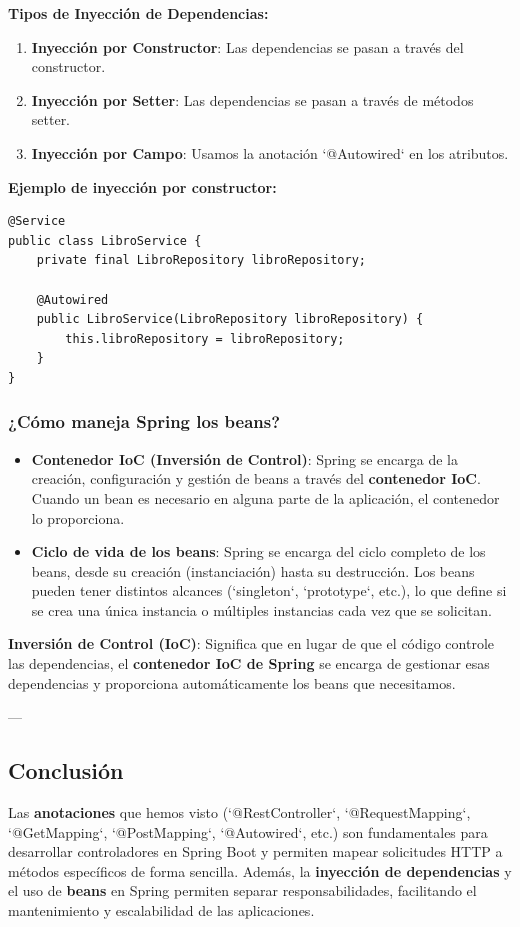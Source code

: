 \documentclass[11pt]{article}
\begin{document}
\textbf{\textbf{Tipos de Inyección de Dependencias:}}
\begin{enumerate}
\item \textbf{\textbf{Inyección por Constructor}}: Las dependencias se pasan a través del constructor.
\item \textbf{\textbf{Inyección por Setter}}: Las dependencias se pasan a través de métodos setter.
\item \textbf{\textbf{Inyección por Campo}}: Usamos la anotación `@Autowired` en los atributos.
\end{enumerate}

\textbf{\textbf{Ejemplo de inyección por constructor:}}
\begin{verbatim}
@Service
public class LibroService {
    private final LibroRepository libroRepository;

    @Autowired
    public LibroService(LibroRepository libroRepository) {
        this.libroRepository = libroRepository;
    }
}
\end{verbatim}

\subsubsection{¿Cómo maneja Spring los beans?}
\label{sec:org852bc64}
\begin{itemize}
\item \textbf{\textbf{Contenedor IoC (Inversión de Control)}}: Spring se encarga de la creación, configuración y gestión de beans a través del \textbf{\textbf{contenedor IoC}}. Cuando un bean es necesario en alguna parte de la aplicación, el contenedor lo proporciona.
\item \textbf{\textbf{Ciclo de vida de los beans}}: Spring se encarga del ciclo completo de los beans, desde su creación (instanciación) hasta su destrucción. Los beans pueden tener distintos alcances (`singleton`, `prototype`, etc.), lo que define si se crea una única instancia o múltiples instancias cada vez que se solicitan.
\end{itemize}

\textbf{\textbf{Inversión de Control (IoC)}}: Significa que en lugar de que el código controle las dependencias, el \textbf{\textbf{contenedor IoC de Spring}} se encarga de gestionar esas dependencias y proporciona automáticamente los beans que necesitamos.

---

\subsection{Conclusión}
\label{sec:org2b5b32e}
Las \textbf{\textbf{anotaciones}} que hemos visto (`@RestController`, `@RequestMapping`, `@GetMapping`, `@PostMapping`, `@Autowired`, etc.) son fundamentales para desarrollar controladores en Spring Boot y permiten mapear solicitudes HTTP a métodos específicos de forma sencilla. Además, la \textbf{\textbf{inyección de dependencias}} y el uso de \textbf{\textbf{beans}} en Spring permiten separar responsabilidades, facilitando el mantenimiento y escalabilidad de las aplicaciones.
\end{document}
